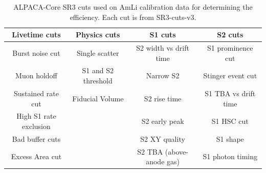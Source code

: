 \begin{table}
    \centering
    \begin{tabular}{c|c|c|c}
     Livetime cuts & Physics cuts & S1 cuts & S2 cuts  \\
     \hline
     Burst noise cut & Single scatter  & S2 width vs drift time & S1 prominence cut \\
     Muon holdoff       & S1 and S2 threshold & Narrow S2 & Stinger event cut \\
     Sustained rate cut & Fiducial Volume & S2 rise time & S1 TBA vs drift time \\
     High S1 rate exclusion & & S2 early peak & S1 HSC cut \\
     Bad buffer cuts & & S2 XY quality & S1 shape \\
     Excess Area cut & & S2 TBA (above-anode gas) & S1 photon timing \\
    \end{tabular}
    \caption{ALPACA-Core SR3 cuts used on AmLi calibration data for determining the efficiency.
    Each cut is from SR3-cuts-v3.
    }
    \label{tab:amli_efficiency_cuts}
\end{table}



